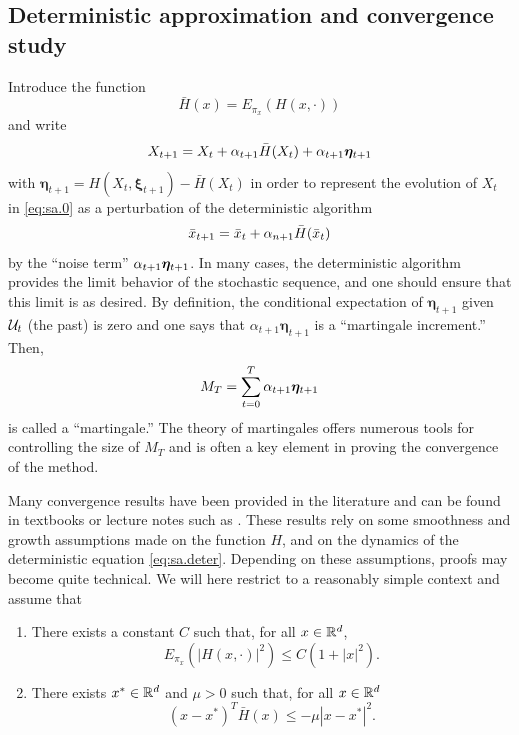  \subsection{Deterministic approximation and convergence study} 
 \label{sec:sgd.convergence}
Introduce the  function
\[
\bar H(x) = E_{\pi_x}(H(x, \cdot))
\]
and write
\[
X_{t+1}  = X_t + \alpha_{t+1} \bar H(X_t)  + \alpha_{t+1} \bm\eta_{t+1}
\]
with $\boldsymbol\eta_{t+1} = H(X_t, \boldsymbol\xi_{t+1}) - \bar H(X_t)$ in order to represent the evolution of $X_t$ in \cref{eq:sa.0} as a perturbation
of the deterministic algorithm
\begin{equation}
\label{eq:sa.deter}
\bar x_{t+1}  = \bar x_t + \alpha_{n+1} \bar H(\bar x_t) 
\end{equation}
by the ``noise term'' $\alpha_{t+1} \bm\eta_{t+1}$. In many cases, the deterministic algorithm provides the limit behavior of the stochastic sequence, and one should ensure that this limit is as desired.  By definition, the conditional expectation of $\boldsymbol\eta_{t+1}$ given ${\mathcal U}_t$ (the past) is zero and one says that $\alpha_{t+1}\boldsymbol\eta_{t+1}$ is a ``martingale increment.'' Then, 
\begin{equation}
\label{eq:sa.M}
M_T = \sum_{t=0}^T \alpha_{t+1} \bm\eta_{t+1}
\end{equation}
 is called a ``martingale.'' The theory of martingales offers numerous  tools for controlling the size of $M_T$ and is often a key element in proving the convergence of the method. 
 
 Many convergence results have been provided in the literature and can be found in textbooks or lecture notes such as \citet{benaim1999dynamics,kushner2003stochastic,benveniste2012adaptive}. These  results rely on some smoothness and growth assumptions made on the function $H$, and on the dynamics of the deterministic equation \cref{eq:sa.deter}. Depending on these assumptions, proofs may become quite technical. We will here restrict to a reasonably simple context and assume that
\begin{enumerate}[label=(H\arabic*)]
\item There exists a constant $C$ such that, for all $x\in {\mathbb{R}}^d$,
\[
E_{\pi_x}(|H(x, \cdot)|^2) \leq C(1+|x|^2).
\]
\item There exists $x^*\in{\mathbb{R}}^d$ and $\mu > 0$ such that, for all $x\in {\mathbb{R}}^d$ 
\[
(x - x^*)^T \bar H(x) \leq - \mu |x - x^*|^2.
\]
\end{enumerate}
 
